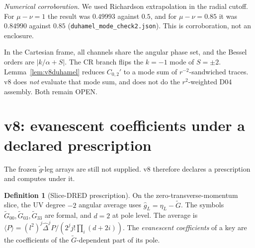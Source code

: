 \documentclass[11pt,a4paper]{article}
\newcommand{\abs}[1]{\lvert#1\rvert}
\newcommand{\loc}[1]{\nolinkurl{#1}}
\newcommand{\OPEN}{\textsf{OPEN}}
\theoremstyle{plain}
\theoremstyle{definition}
\newtheorem{definition}[theorem]{Definition}
\theoremstyle{remark}
\numberwithin{equation}{section}
\begin{document}
\noindent\emph{Numerical corroboration.} We used Richardson
extrapolation in the radial cutoff. For \(\mu-\nu=1\) the result
was \(0.49993\) against \(0.5\), and for \(\mu-\nu=0.85\) it was
\(0.84990\) against \(0.85\)
(\loc{duhamel_mode_check2.json}). This is corroboration, not an
enclosure.

In the Cartesian frame, all channels share the angular phase set,
and the Bessel orders are \(\abs{k/\alpha+S}\). The CR branch flips
the \(k=-1\) mode of \(S=\pm2\). Lemma~\ref{lem:v8duhamel} reduces
\(C_{0,2}'\) to a mode sum of \(r^{-2}\)-sandwiched traces.
v8 does \emph{not} evaluate that mode sum, and does not do the
\(r^2\)-weighted D04 assembly. Both remain \OPEN.

\section{v8: evanescent coefficients under a declared prescription}
\label{sec:v8evan}

The frozen \(\tilde g\)-leg arrays are still not supplied. v8
therefore declares a prescription and computes under it.

\begin{definition}[Slice-DRED prescription]
On the zero-transverse-momentum slice, the UV degree \(-2\) angular
average uses \(\hat g_L=\eta_L-\tilde G\). The symbols
\(\tilde G_{00},\tilde G_{03},\tilde G_{33}\) are formal, and
\(d=2\) at pole level. The average is
\(\langle P\rangle=(l^2)^j\hat\Delta^jP/(2^jj!\prod_i(d+2i))\).
The \emph{evanescent coefficients} of a key are the coefficients of
the \(\tilde G\)-dependent part of its pole.
\end{definition}
\end{document}
